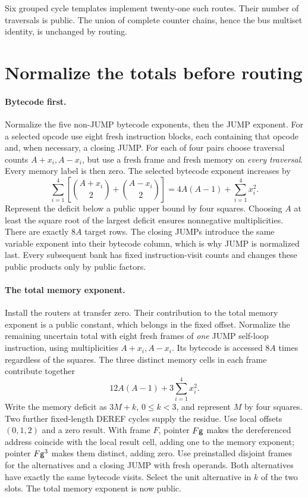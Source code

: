 \documentclass[11pt]{article}
\begin{document}
Six grouped cycle templates implement twenty-one such routes. Their number of traversals is public. The union of complete counter chains, hence the bus multiset identity, is unchanged by routing.

\section{Normalize the totals before routing}

\paragraph{Bytecode first.} Normalize the five non-JUMP bytecode exponents, then the JUMP exponent. For a selected opcode use eight fresh instruction blocks, each containing that opcode and, when necessary, a closing JUMP. For each of four pairs choose traversal counts $A+x_i,A-x_i$, but use a fresh frame and fresh memory on \emph{every traversal}. Every memory label is then zero. The selected bytecode exponent increases by
\[
 \sum_{i=1}^4\left[\binom{A+x_i}{2}+\binom{A-x_i}{2}\right]
 =4A(A-1)+\sum_{i=1}^4x_i^2.
\]
Represent the deficit below a public upper bound by four squares. Choosing $A$ at least the square root of the largest deficit ensures nonnegative multiplicities. There are exactly $8A$ target rows. The closing JUMPs introduce the same variable exponent into their bytecode column, which is why JUMP is normalized last. Every subsequent bank has fixed instruction-visit counts and changes these public products only by public factors.

\paragraph{The total memory exponent.} Install the routers at transfer zero. Their contribution to the total memory exponent is a public constant, which belongs in the fixed offset. Normalize the remaining uncertain total with eight fresh frames of \emph{one} JUMP self-loop instruction, using multiplicities $A+x_i,A-x_i$. Its bytecode is accessed $8A$ times regardless of the squares. The three distinct memory cells in each frame contribute together
\[
 12A(A-1)+3\sum_{i=1}^4x_i^2.
\]
Write the memory deficit as $3M+k$, $0\le k<3$, and represent $M$ by four squares. Two further fixed-length DEREF cycles supply the residue. Use local offsets $(0,1,2)$ and a zero result. With frame $F$, pointer $F\mathsf{g}$ makes the dereferenced address coincide with the local result cell, adding one to the memory exponent; pointer $F\mathsf{g}^3$ makes them distinct, adding zero. Use preinstalled disjoint frames for the alternatives and a closing JUMP with fresh operands. Both alternatives have exactly the same bytecode visits. Select the unit alternative in $k$ of the two slots. The total memory exponent is now public.
\end{document}

